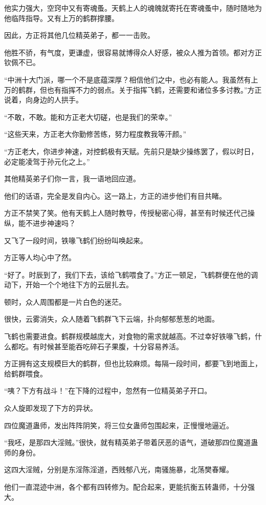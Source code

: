 \begin{this_body}
他实力强大，空窍中又有寄魂蚤。天鹤上人的魂魄就寄托在寄魂蚤中，随时随地为他临阵指导。又有上万的鹤群撑腰。

因此，方正将其他几位精英弟子，都一一击败。

他胜不骄，有气度，更谦虚，很容易就博得众人好感，被众人推为首领。都对方正钦佩不已。

“中洲十大门派，哪一个不是底蕴深厚？相信他们之中，也必有能人。我虽然有上万的鹤群，但也有指挥不力的弱点。关于指挥飞鹤，还需要和诸位多多讨教。”方正说着，向身边的人拱手。

“不敢，不敢。能和方正老大切磋，也是我们的荣幸。”

“这些天来，方正老大你勤修苦练，努力程度教我等汗颜。”

“方正老大，你进步神速，对控鹤极有天赋。先前只是缺少操练罢了，假以时日，必定能凌驾于孙元化之上。”

其他精英弟子们你一言，我一语地回应道。

他们的话语，完全是发自内心。这一路上，方正的进步他们有目共睹。

方正不禁笑了笑。他有天鹤上人随时教导，传授秘密心得，甚至有时候还代己操纵，能不进步神速吗？

又飞了一段时间，铁喙飞鹤们纷纷叫唤起来。

方正等人均心中了然。

“好了。时辰到了，我们下去，该给飞鹤喂食了。”方正一顿足，飞鹤群便在他的调动下，开始一个个地往下方的云层扎去。

顿时，众人周围都是一片白色的迷茫。

很快，云雾消失，众人随着飞鹤群飞下云端，扑向郁郁葱葱的地面。

飞鹤也需要进食。鹤群规模越庞大，对食物的需求就越高。不过幸好铁喙飞鹤，什么都吃。有时候甚至能吞吃碎石子果腹，十分容易养活。

方正拥有这支规模巨大的鹤群，但也比较麻烦。每隔一段时间，都要飞到地面上，给鹤群喂食。

“咦？下方有战斗！”在下降的过程中，忽然有一位精英弟子开口。

众人旋即发现了下方的异状。

四位魔道蛊师，发出阵阵阴笑，将三位女蛊师包围起来，正慢慢地逼近。

“我呸，是那四大淫贼。”很快，就有精英弟子带着厌恶的语气，道破那四位魔道蛊师的身份。

这四大淫贼，分别是东淫陈淫道，西贱郁八光，南骚施暴，北荡樊春耀。

他们一直混迹中洲，各个都有四转修为。配合起来，更能抗衡五转蛊师，十分强大。


\end{this_body}
